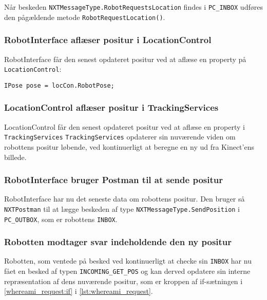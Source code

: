 Når beskeden \lstinline[style=csharp]!NXTMessageType.RobotRequestsLocation! findes i \lstinline[style=csharp]!PC_INBOX! udføres den pågældende metode \lstinline[style=csharp]!RobotRequestLocation()!.


\subsubsection{RobotInterface aflæser positur i LocationControl}
RobotInterface får den senest opdateret positur ved at aflæse en property på \lstinline[style=csharp]!LocationControl!:

\begin{lstlisting}[style=csharpsmall]
IPose pose = locCon.RobotPose;
\end{lstlisting}

\subsubsection{LocationControl aflæser positur i TrackingServices}
LocationControl får den senest opdateret positur ved at aflæse en property i \lstinline[style=csharp]!TrackingServices!
\lstinline[style=csharp]!TrackingServices! opdaterer sin nuværende viden om robottens positur løbende, ved kontinuerligt at beregne en ny ud fra Kinect'ens billede.

\subsubsection{RobotInterface bruger Postman til at sende positur}
RobotInterface har nu det seneste data om robottens positur.
Den bruger så \lstinline[style=csharp]!NXTPostman! til at lægge beskeden af type \lstinline[style=csharp]!NXTMessageType.SendPosition! i \lstinline[style=csharp]!PC_OUTBOX!, som er robottens \lstinline[style=c]!INBOX!.

\subsubsection{Robotten modtager svar indeholdende den ny positur}
Robotten, som ventede på besked ved kontinuerligt at checke sin \lstinline[style=c]!INBOX! har nu fået en besked af typen \lstinline[style=c]!INCOMING_GET_POS! og kan derved opdatere sin interne repræsentation af dens nuværende positur, som er kroppen af if-sætningen i \cref{whereami_request:if} i \cref{lst:whereami_request}.
